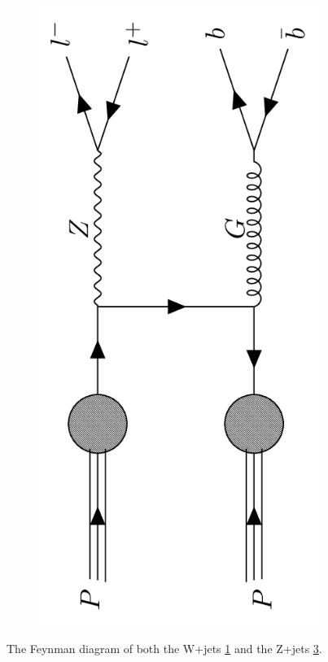 \begin{figure}
{\begin{subfigure}{.2\textwidth}
        \caption{}
        \label{fig:w_pjets}
    \end{subfigure}
    \hfill
    \begin{subfigure}{.2\textwidth}
        \includegraphics[width=\textwidth, angle = -90]{Figures/FDiagrams/Z_pjets.png}
        \caption{}
        \label{fig:z_pjets}
    \end{subfigure}
    }
    \caption{The Feynman diagram of both the W+jets \ref{fig:w_pjets} and the Z+jets \ref{fig:z_pjets}.}
\end{figure}

